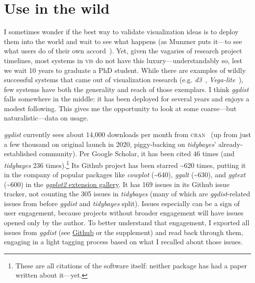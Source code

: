 \documentclass[journal]{vgtc}                     %
\begin{document}
\section{Use in the wild}
\label{sec:use-in-the-wild}


I sometimes wonder if the best way to validate visualization ideas is to deploy them into the world and wait to see what happens (as Munzner puts it---to see what users do of their own accord~\cite{munzner2009nested}). Yet, given the vagaries of research project timelines, most systems in \textsc{vis} do not have this luxury---understandably so, lest we wait 10 years to graduate a PhD student. While there are examples of wildly successful systems that came out of visualization research (e.g. \textit{d3}~\cite{bostock2011d3}, \textit{Vega-lite}~\cite{satyanarayan2016vega}), few systems have both the generality and reach of those exemplars. I think \textit{ggdist} falls somewhere in the middle: it has been deployed for several years and enjoys a modest following. This gives me the opportunity to look at some coarse---but naturalistic---data on usage.

\textit{ggdist} currently sees about 14,000 downloads per month from \textsc{cran}~\cite{csardi2019cranlogs} (up from just a few thousand on original launch in 2020, piggy-backing on \textit{tidybayes}' already-established community). Per Google Scholar, it has been cited 46 times (and \textit{tidybayes} 236 times).\footnote{These are all citations of the software itself: neither package has had a paper written about it---yet.} Its Github project has been starred \textasciitilde 620 times, putting it in the company of popular packages like \textit{cowplot} (\textasciitilde 640), \textit{ggalt} (\textasciitilde 630), and \textit{ggtext} (\textasciitilde 600) in the \href{https://exts.ggplot2.tidyverse.org/gallery/}{\textit{ggplot2} extension gallery}. It has 169 issues in its Github issue tracker, not counting the 305 issues in \textit{tidybayes} (many of which are \textit{ggdist}-related issues from before \textit{ggdist} and \textit{tidybayes} split). Issues especially can be a sign of user engagement, because projects without broader engagement will have issues opened only by the author. To better understand that engagement, I exported all issues from \textit{ggdist} (see \href{https://github.com/mjskay/ggdist/issues}{Github} or the supplement) and read back through them, engaging in a light tagging process based on what I recalled about those issues.
\end{document}
